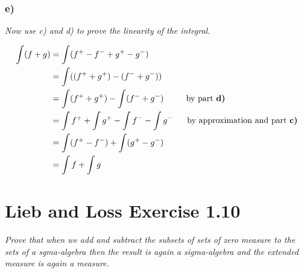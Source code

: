 \documentclass[12pt]{article}
\theoremstyle{plain}
\begin{document}
\subsubsection*{ e)}
\emph{Now use c) and d) to prove the linearity of the integral.}

\begin{align*}
    \int(f + g) &= \int(f^+ - f^- + g^+ - g^-) \\
    &= \int((f^+ + g^+) - (f^- + g^-)) \\
    &= \int(f^+ + g^+) - \int(f^- + g^-)\ \ \ \ \ \ \ \ \text{by part \textbf{d)}} \\ 
    &= \int f^+ + \int g^+ - \int f^- - \int g^-\ \ \ \ \ \text{by approximation and part \textbf{c)}} \\
    &= \int (f^+ - f^-) + \int(g^+ - g^-) \\
    &= \int f + \int g
\end{align*}

\section*{Lieb and Loss Exercise 1.10}
\emph{Prove that when we add and subtract the subsets of sets of zero measure to the sets of a sgma-algebra then the result is again a sigma-algebra and the extended measure is again a measure.} \\
\end{document}
